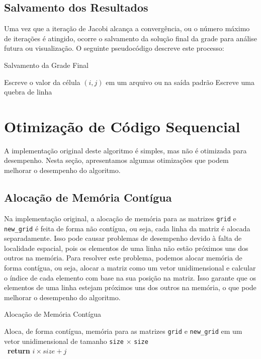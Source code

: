 \documentclass[conference]{IEEEtran}
\begin{document}
\subsection{Salvamento dos Resultados}

Uma vez que a iteração de Jacobi alcança a convergência, ou o número máximo de iterações é atingido, ocorre o salvamento da solução final da grade para análise futura ou visualização. O seguinte pseudocódigo descreve este processo:

\begin{algorithm}[H]
    \caption{Salvamento da Grade Final}
    \begin{algorithmic}[1]
        \State Escreve o valor da célula $(i, j)$ em um arquivo ou na saída padrão
        \EndFor
        \State Escreve uma quebra de linha
        \EndFor
        \EndFunction
    \end{algorithmic}
\end{algorithm}

\section{Otimização de Código Sequencial}

A implementação original deste algoritmo é simples, mas não é otimizada para desempenho. Nesta seção, apresentamos algumas otimizações que podem melhorar o desempenho do algoritmo.

\subsection{Alocação de Memória Contígua}

Na implementação original, a alocação de memória para as matrizes \texttt{grid} e \texttt{new\_grid} é feita de forma não contígua, ou seja, cada linha da matriz é alocada separadamente. Isso pode causar problemas de desempenho devido à falta de localidade espacial, pois os elementos de uma linha não estão próximos uns dos outros na memória. Para resolver este problema, podemos alocar memória de forma contígua, ou seja, alocar a matriz como um vetor unidimensional e calcular o índice de cada elemento com base na sua posição na matriz. Isso garante que os elementos de uma linha estejam próximos uns dos outros na memória, o que pode melhorar o desempenho do algoritmo.

\begin{algorithm}[H]
    \caption{Alocação de Memória Contígua}
    \begin{algorithmic}[1]
        \State Aloca, de forma contígua, memória para as matrizes \texttt{grid} e \texttt{new\_grid} em um vetor unidimensional de tamanho \texttt{size} \(\times\) \texttt{size}
        \EndFunction
        \\
        \
        \State \textbf{return} $i \times size + j$
        \EndFunction
    \end{algorithmic}
\end{algorithm}
\end{document}
